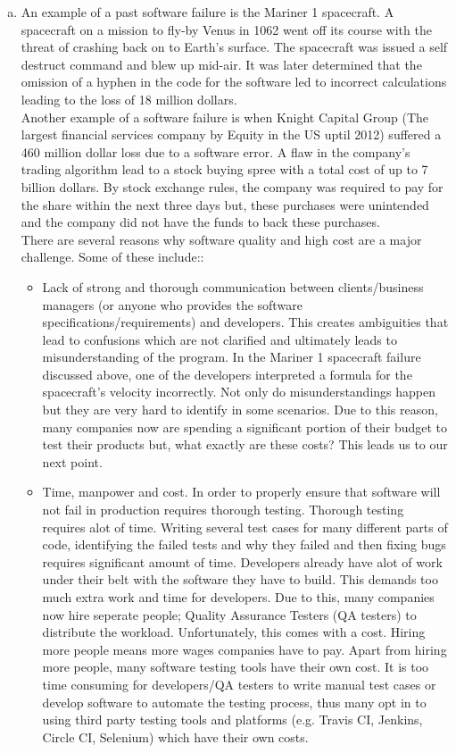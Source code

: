 \documentclass[12pt]{article}
\begin{document}
\begin{enumerate}[(a)]
\item An example of a past software failure is the Mariner 1 spacecraft. A spacecraft on a mission to fly-by Venus in 1062
went off its course with the threat of crashing back on to Earth's surface. The spacecraft was issued a self destruct command and 
blew up mid-air. It was later determined that the omission of a hyphen in the code for the software led to incorrect calculations leading to the loss of 18 million dollars. \\
Another example of a software failure is when Knight Capital Group (The largest financial services company by Equity in the US uptil 2012) suffered a 460 million dollar loss due to a software error. A flaw in the company's trading algorithm lead to a stock buying spree with a total cost of up to 7 billion dollars. By stock exchange rules, the company was required to pay for the share within the next three days but, these purchases were unintended and the company did not have the funds to back these purchases. \\
There are several reasons why software quality and high cost are a major challenge. Some of these include::

\begin{itemize}
\item Lack of strong and thorough communication between clients/business managers (or anyone who provides the software specifications/requirements) and developers. This creates ambiguities that lead to confusions which are not clarified and ultimately leads to misunderstanding of the program. In the Mariner 1 spacecraft failure discussed above, one of the developers interpreted a formula for the spacecraft's velocity incorrectly. Not only do misunderstandings happen but they are very hard to identify in some scenarios. Due to this reason, many companies now are spending a significant portion of their budget to test their products but, what exactly are these costs? This leads us to our next point.

\item Time, manpower and cost. In order to properly ensure that software will not fail in production requires thorough testing. Thorough testing requires alot of time. Writing several test cases for many different parts of code, identifying the failed tests and why they failed and then fixing bugs requires significant amount of time. Developers already have alot of work under their belt with the software they have to build. This demands too much extra work and time for developers. Due to this, many companies now hire seperate people; Quality Assurance Testers (QA testers) to distribute the workload. Unfortunately, this comes with a cost. Hiring more people means more wages companies have to pay. Apart from hiring more people, many software testing tools have their own cost. It is too time consuming for developers/QA testers to write manual test cases or develop software to automate the testing process, thus many opt in to using third party testing tools and platforms (e.g. Travis CI, Jenkins, Circle CI, Selenium) which have their own costs.


\end{itemize}
\end{enumerate}
\end{document}
